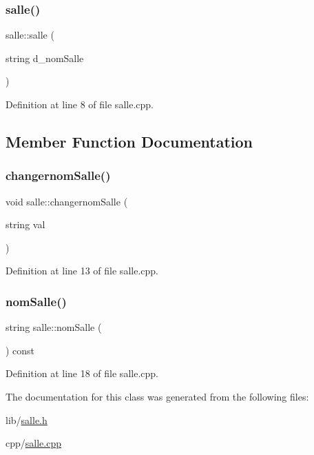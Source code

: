 \hypertarget{classsalle_a31f6417c7498ad8c11ca6d4a5a7fe756}{}\label{classsalle_a31f6417c7498ad8c11ca6d4a5a7fe756} 
\subsubsection{\texorpdfstring{salle()}{salle()}\hspace{0.1cm}{\footnotesize\ttfamily [2/2]}}
{\footnotesize\ttfamily salle\+::salle (\begin{DoxyParamCaption}\item[{string}]{d\+\_\+nom\+Salle }\end{DoxyParamCaption})}



Definition at line 8 of file salle.\+cpp.



\subsection{Member Function Documentation}
\hypertarget{classsalle_acff7bb9d121b2902baf994480c0a915b}{}\label{classsalle_acff7bb9d121b2902baf994480c0a915b} 
\subsubsection{\texorpdfstring{changernom\+Salle()}{changernomSalle()}}
{\footnotesize\ttfamily void salle\+::changernom\+Salle (\begin{DoxyParamCaption}\item[{string}]{val }\end{DoxyParamCaption})}



Definition at line 13 of file salle.\+cpp.

\hypertarget{classsalle_a9aa203edb5af116d0b4200390408d573}{}\label{classsalle_a9aa203edb5af116d0b4200390408d573} 
\subsubsection{\texorpdfstring{nom\+Salle()}{nomSalle()}}
{\footnotesize\ttfamily string salle\+::nom\+Salle (\begin{DoxyParamCaption}{ }\end{DoxyParamCaption}) const}



Definition at line 18 of file salle.\+cpp.



The documentation for this class was generated from the following files\+:\begin{DoxyCompactItemize}
\item 
lib/\hyperlink{salle_8h}{salle.\+h}\item 
cpp/\hyperlink{salle_8cpp}{salle.\+cpp}\end{DoxyCompactItemize}
